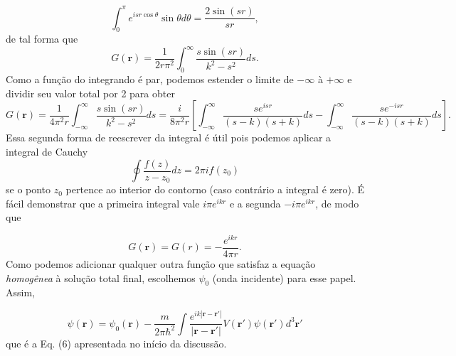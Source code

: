 \documentclass{article}
\begin{document}
\begin{equation}
    \int_0^{\pi} e^{isr\cos\theta} \sin\theta d\theta = \frac{2\sin(sr)}{sr},
\end{equation}
de tal forma que
\begin{equation}
    G(\mathbf{r}) = \frac{1}{2r\pi^2 }\int_0^{\infty} \frac{s\sin(sr)}{k^2 - s^2}ds.
\end{equation}
Como a função do integrando é par, podemos estender o limite de $-\infty$ à $+\infty$ e dividir seu valor total por 2 para obter
\begin{equation}
    G(\mathbf{r}) = \frac{1}{4\pi^2 r }\int_{-\infty}^{\infty} \frac{s\sin(sr)}{k^2 - s^2}ds = \frac{i}{8\pi^2 r}\left[ \int_{-\infty}^{\infty} \frac{se^{isr}}{(s-k)(s+k)}ds - \int_{-\infty}^{\infty} \frac{se^{-isr}}{(s-k)(s+k)}ds\right].
\end{equation}
Essa segunda forma de reescrever da integral é útil pois podemos aplicar a integral de Cauchy
\begin{equation}
    \oint \frac{f(z)}{z-z_0} dz = 2\pi i f(z_0)
\end{equation}
se o ponto $z_0$ pertence ao interior do contorno (caso contrário a integral é zero). É fácil demonstrar que a primeira integral vale $i\pi e^{ikr}$ e a segunda $-i\pi e^{ikr}$, de modo que

\begin{equation}
    G(\mathbf{r}) = G(r) = - \frac{e^{ikr}}{4\pi r}.
\end{equation}
Como podemos adicionar qualquer outra função que satisfaz a equação \textit{homogênea} à solução total final, escolhemos $\psi_0$ (onda incidente) para esse papel. Assim,

\begin{equation}
    \psi(\mathbf{r}) = \psi_0 (\mathbf{r}) - \frac{m}{2\pi\hbar^2}\int \frac{e^{ik|\mathbf{r}-\mathbf{r}'|}}{|\mathbf{r}-\mathbf{r}'|}V(\mathbf{r}')\psi(\mathbf{r}')d^{3}\mathbf{r}'
\end{equation}
que é a Eq. (6) apresentada no início da discussão.
\end{document}
